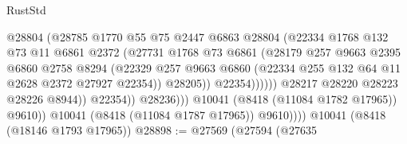 \begin{lexlean}{RustStd}
\begin{coremodule}
                                      @28804
                                      (@28785
                                        @1770
                                        @55
                                        @75
                                        @2447
                                        @6863
                                        @28804
                                        (@22334
                                          @1768
                                          @132
                                          @73
                                          @11
                                          @6861
                                          @2372
                                          (@27731
                                            @1768
                                            @73
                                            @6861
                                            (@28179
                                              @257
                                              @9663
                                              @2395
                                              @6860
                                              @2758
                                              @8294
                                              (@22329
                                                @257
                                                @9663
                                                @6860
                                                (@22334
                                                  @255
                                                  @132
                                                  @64
                                                  @11
                                                  @2628
                                                  @2372
                                                  @27927
                                                  @22354))
                                              @28205))
                                          @22354))))))
                              @28217
                              @28220
                              @28223
                              @28226
                              @8944))
                          @22354))
                      @28236)))
                @10041
                (@8418 (@11084 @1782 @17965))
                @9610))
            @10041
            (@8418 (@11084 @1787 @17965))
            @9610))))
    @10041
    (@8418 (@18146 @1793 @17965))
@28898 := @27569
    (@27594
      (@27635

\end{coremodule}
\end{lexlean}
